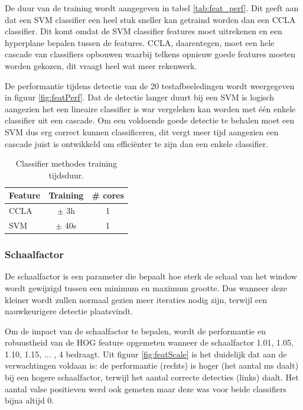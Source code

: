 De duur van de training wordt aangegeven in tabel \ref{tab:feat_perf}. Dit geeft aan dat een SVM classifier een heel stuk sneller kan getraind worden dan een CCLA classifier. Dit komt omdat de SVM classifier features moet uitrekenen en een hyperplane bepalen tussen de features. CCLA, daarentegen, moet een hele cascade van classifiers opbouwen waarbij telkens opnieuw goede features moeten worden gekozen, dit vraagt heel wat meer rekenwerk.

De performantie tijdens detectie van de 20 testafbeeledingen wordt weergegeven in figuur \ref{fig:featPerf}. Dat de detectie langer duurt bij een SVM is logisch aangezien het een lineaire classifier is war vergeleken kan worden met \'e\'en enkele classifier uit een cascade. Om een voldoende goede detectie te behalen moet een SVM dus erg correct kunnen classificeren, dit vergt meer tijd aangezien een cascade juist is ontwikkeld om effici\"enter te zijn dan een enkele classifier.

\begin{table}
  \centering
  \begin{tabular}{@{}lcc@{}} \toprule
    Feature & Training & \# cores \\ \midrule
    CCLA & $\pm$ 3h & 1\\
    SVM & $\pm$ 40s & 1\\ \bottomrule
  \end{tabular}
  \caption{Classifier methodes training tijdsduur.}
  \label{tab:class_perf}
\end{table}

\subsubsection*{Schaalfactor}
De schaalfactor is een parameter die bepaalt hoe sterk de schaal van het window wordt gewijzigd tussen een minimum en maximum grootte. Dus wanneer deze kleiner wordt zullen normaal gezien meer iteraties nodig zijn, terwijl een nauwkeurigere detectie plaatsvindt.

Om de impact van de schaalfactor te bepalen, wordt de performantie en robuustheid van de HOG feature opgemeten wanneer de schaalfactor 1.01, 1.05, 1.10, 1.15, ... , 4 bedraagt. Uit figuur \ref{fig:featScale} is het duidelijk dat aan de verwachtingen voldaan is: de performantie (rechts) is hoger (het aantal ms daalt) bij een hogere schaalfactor, terwijl het aantal correcte detecties (links) daalt. Het aantal valse positieven werd ook gemeten maar deze was voor beide classifiers bijna altijd 0. 


